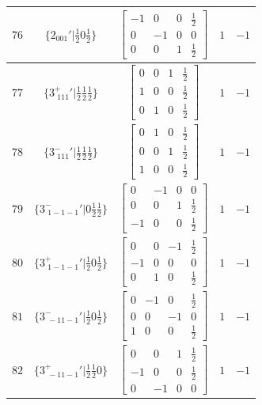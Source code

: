 \documentclass[fleqn,8pt]{jsarticle}
\begin{document}
\begin{longtable}{ccccc}
$ 76 $ & $ \{2{}_{001}{}'|\frac{1}{2} 0 \frac{1}{2}\} $ & $ \begin{bmatrix} -1 & 0 & 0 & \frac{1}{2} \\ 0 & -1 & 0 & 0 \\ 0 & 0 & 1 & \frac{1}{2} \end{bmatrix} $ & $ 1 $ & $ -1 $ \\ \hline
$ 77 $ & $ \{3^{+}_{\,\,111}{}'|\frac{1}{2} \frac{1}{2} \frac{1}{2}\} $ & $ \begin{bmatrix} 0 & 0 & 1 & \frac{1}{2} \\ 1 & 0 & 0 & \frac{1}{2} \\ 0 & 1 & 0 & \frac{1}{2} \end{bmatrix} $ & $ 1 $ & $ -1 $ \\ \hline
$ 78 $ & $ \{3^{-}_{\,\,111}{}'|\frac{1}{2} \frac{1}{2} \frac{1}{2}\} $ & $ \begin{bmatrix} 0 & 1 & 0 & \frac{1}{2} \\ 0 & 0 & 1 & \frac{1}{2} \\ 1 & 0 & 0 & \frac{1}{2} \end{bmatrix} $ & $ 1 $ & $ -1 $ \\ \hline
$ 79 $ & $ \{3^{-}_{\,\,1-1-1}{}'|0 \frac{1}{2} \frac{1}{2}\} $ & $ \begin{bmatrix} 0 & -1 & 0 & 0 \\ 0 & 0 & 1 & \frac{1}{2} \\ -1 & 0 & 0 & \frac{1}{2} \end{bmatrix} $ & $ 1 $ & $ -1 $ \\ \hline
$ 80 $ & $ \{3^{+}_{\,\,1-1-1}{}'|\frac{1}{2} 0 \frac{1}{2}\} $ & $ \begin{bmatrix} 0 & 0 & -1 & \frac{1}{2} \\ -1 & 0 & 0 & 0 \\ 0 & 1 & 0 & \frac{1}{2} \end{bmatrix} $ & $ 1 $ & $ -1 $ \\ \hline
$ 81 $ & $ \{3^{-}_{\,\,-11-1}{}'|\frac{1}{2} 0 \frac{1}{2}\} $ & $ \begin{bmatrix} 0 & -1 & 0 & \frac{1}{2} \\ 0 & 0 & -1 & 0 \\ 1 & 0 & 0 & \frac{1}{2} \end{bmatrix} $ & $ 1 $ & $ -1 $ \\ \hline
$ 82 $ & $ \{3^{+}_{\,\,-11-1}{}'|\frac{1}{2} \frac{1}{2} 0\} $ & $ \begin{bmatrix} 0 & 0 & 1 & \frac{1}{2} \\ -1 & 0 & 0 & \frac{1}{2} \\ 0 & -1 & 0 & 0 \end{bmatrix} $ & $ 1 $ & $ -1 $ \\ \hline

\end{longtable}
\end{document}

